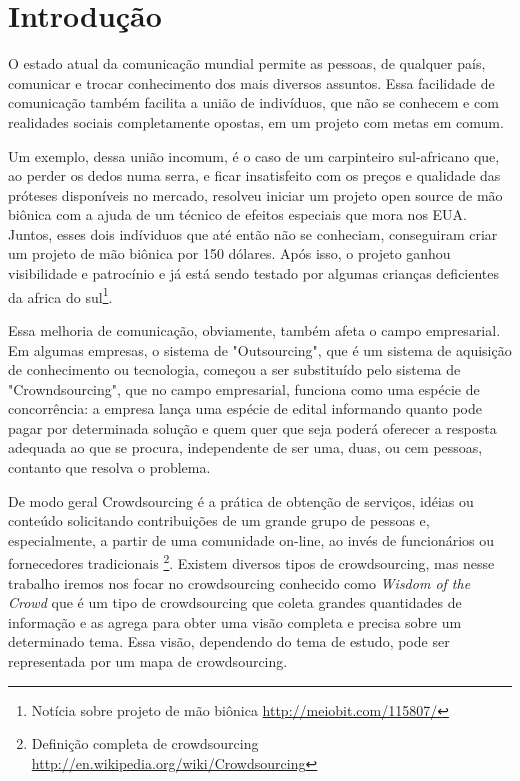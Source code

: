 \chapter{Introdução}

O estado atual da comunicação mundial permite as pessoas, de qualquer país, comunicar e trocar conhecimento dos mais diversos assuntos. Essa facilidade de comunicação também facilita a união de indivíduos, que não se conhecem e com realidades sociais completamente opostas, em um projeto com metas em comum.

Um exemplo, dessa união incomum, é o caso de um carpinteiro sul-africano que, ao perder os dedos numa serra, e ficar insatisfeito com os preços e qualidade das próteses disponíveis no mercado, resolveu iniciar um projeto open source de mão biônica com a ajuda de um técnico de efeitos especiais que mora nos EUA. Juntos, esses dois indíviduos que até então não se conheciam, conseguiram criar um projeto de mão biônica por 150 dólares. Após isso, o projeto ganhou visibilidade e patrocínio e já está sendo testado por algumas crianças deficientes da africa do sul\footnote{\label{maobionica} Notícia sobre projeto de mão biônica \url{http://meiobit.com/115807/}}.

Essa melhoria de comunicação, obviamente, também  afeta o campo empresarial. Em algumas empresas, o sistema de "Outsourcing", que é um sistema de aquisição de conhecimento ou tecnologia, começou a ser substituído pelo sistema de "Crowndsourcing", que no campo empresarial, funciona como uma espécie de concorrência: a empresa lança uma espécie de edital informando quanto pode pagar por determinada solução e quem quer que seja poderá oferecer a resposta adequada ao que se procura, independente de ser uma, duas, ou cem pessoas, contanto que resolva o problema.

De modo geral Crowdsourcing é a prática de obtenção de serviços, idéias ou conteúdo solicitando contribuições de um grande grupo de pessoas e, especialmente, a partir de uma comunidade on-line, ao invés de funcionários ou fornecedores tradicionais \footnote{\label{wiki-crowd} Definição completa de crowdsourcing \url{ http://en.wikipedia.org/wiki/Crowdsourcing}}.
Existem diversos tipos de crowdsourcing, mas nesse trabalho iremos nos focar no crowdsourcing conhecido como \emph{Wisdom of the Crowd} que é um tipo de crowdsourcing que coleta grandes quantidades de informação e as agrega para obter uma visão completa e precisa sobre um determinado tema. Essa visão, dependendo do tema de estudo, pode ser representada por um mapa de crowdsourcing.

